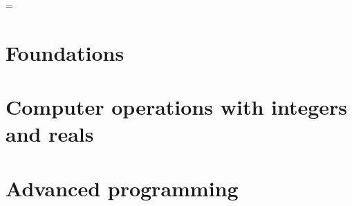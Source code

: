 \documentclass[a4paper,10pt,twoside,english]{book}
\begin{document}
    
    \parskip = \baselineskip
    
    \mainmatter
  
    \newcommand\home{./Fortran_project/sources/IEEE}
  
   
    
  \part{Foundations}\label{PartI}
         
         
         
         
         
          
         
   
 
  \part{Computer operations with integers and reals}\label{PartII} 
       
       
       
       
   
   
  
  \part{Advanced programming}\label{PartIII}
         
         
            
        
       
      
       
        
       
       
\end{document}
